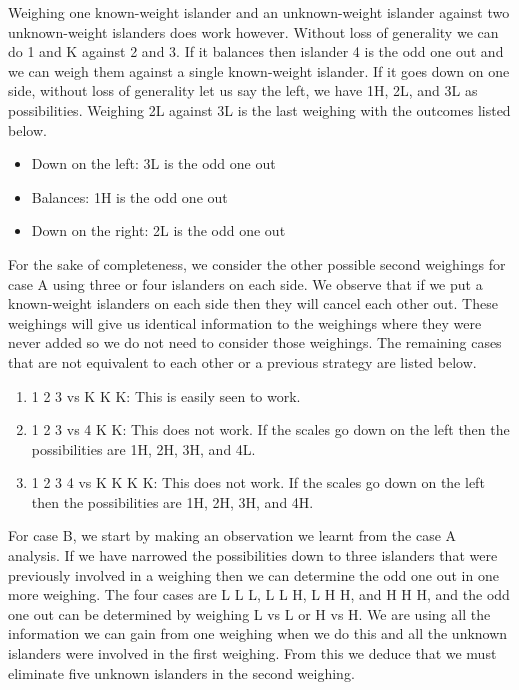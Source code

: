 Weighing one known-weight islander and an unknown-weight islander against two unknown-weight islanders does work however. Without loss of generality we can do 1 and K against 2 and 3. If it balances then islander 4 is the odd one out and we can weigh them against a single known-weight islander. If it goes down on one side, without loss of generality let us say the left, we have 1H, 2L, and 3L as possibilities. Weighing 2L against 3L is the last weighing with the outcomes listed below.

\begin{itemize}
	\item Down on the left: 3L is the odd one out
	\item Balances: 1H is the odd one out
	\item Down on the right: 2L is the odd one out
\end{itemize}

For the sake of completeness, we consider the other possible second weighings for case A using three or four islanders on each side. We observe that if we put a known-weight islanders on each side then they will cancel each other out. These weighings will give us identical information to the weighings where they were never added so we do not need to consider those weighings. The remaining cases that are not equivalent to each other or a previous strategy are listed below.

\begin{enumerate}
	\item 1 2 3 vs K K K: This is easily seen to work.
	\item 1 2 3 vs 4 K K: This does not work. If the scales go down on the left then the possibilities are 1H, 2H, 3H, and 4L.
	\item 1 2 3 4 vs K K K K: This does not work. If the scales go down on the left then the possibilities are 1H, 2H, 3H, and 4H.
\end{enumerate}

For case B, we start by making an observation we learnt from the case A analysis. If we have narrowed the possibilities down to three islanders that were previously involved in a weighing then we can determine the odd one out in one more weighing. The four cases are L L L, L L H, L H H, and H H H, and the odd one out can be determined by weighing L vs L or H vs H. We are using all the information we can gain from one weighing when we do this and all the unknown islanders were involved in the first weighing. From this we deduce that we must eliminate five unknown islanders in the second weighing.

